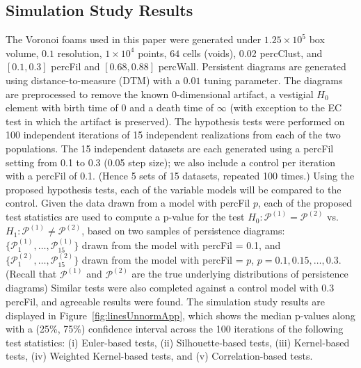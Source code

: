 \documentclass[12pt]{article}
\newcommand{\figref}[1]{Figure~\ref{#1}}
\begin{document}
\subsection{Simulation Study Results}
\label{sec:results1}
The Voronoi foams used in this paper were generated under $1.25 \times  10^{5}$ box volume, $0.1$ resolution, $1 \times  10^{4}$ points, $64$ cells (voids), 0.02 percClust, and $[0.1, 0.3]$ percFil and $[0.68, 0.88]$ percWall. Persistent diagrams are generated using distance-to-measure (DTM) with a $0.01$ tuning parameter. The diagrams are preprocessed to remove the known 0-dimensional artifact, a vestigial $H_{0}$ element with birth time of 0 and a death time of $\infty$ (with exception to the EC test in which the artifact is preserved). The hypothesis tests were performed on 100 independent iterations of 15 independent realizations from each of the two populations. The 15 independent datasets are each generated using a percFil setting from 0.1 to 0.3 (0.05 step size); we also include a control per iteration with a percFil of 0.1. (Hence 5 sets of 15 datasets, repeated 100 times.) Using the proposed hypothesis tests, each of the variable models will be compared to the control. Given the data drawn from a model with percFil $p$, each of the proposed test statistics are used to compute a p-value for the test $H_0: \mathcal
P^{(1)} = \mathcal P^{(2)}$ vs. $H_1: \mathcal P^{(1)} \neq \mathcal P^{(2)}$,
based on two samples of persistence diagrams: $\{\mathcal
P_1^{(1)}, \ldots, \mathcal P_{15}^{(1)}\}$ drawn from the model with percFil = 0.1, and $\{\mathcal P_1^{(2)}, \ldots,
\mathcal P_{15}^{(2)}\}$ drawn from the model with percFil = $p$, $p = 0.1, 0.15, \ldots, 0.3$.
(Recall that $\mathcal P^{(1)}$ and $\mathcal P^{(2)}$ are the true underlying distributions of persistence diagrams)
Similar tests were also completed against a control model with 0.3 percFil, and agreeable results were found. The simulation study results are displayed in \figref{fig:linesUnnormApp}, which shows the median p-values along with a (25\%, 75\%) confidence interval across the 100 iterations of the following test statistics: (i) Euler-based tests, (ii) Silhouette-based tests, (iii) Kernel-based tests, (iv) Weighted Kernel-based tests, and (v) Correlation-based tests.
\end{document}
